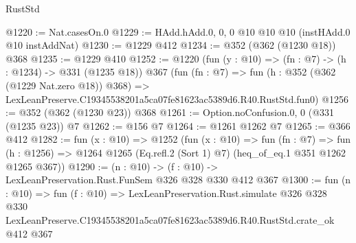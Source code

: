 \begin{lexlean}{RustStd}
\begin{coremodule}
@1220 := Nat.casesOn.{0}
@1229 := HAdd.hAdd.{0, 0, 0} @10 @10 @10 (instHAdd.{0} @10 instAddNat)
@1230 := @1229 @412
@1234 := @352 (@362 (@1230 @18)) @368
@1235 := @1229 @410
@1252 := @1220
    (fun (y : @10) => (fn : @7) -> (h : @1234) -> @331 (@1235 @18))
    @367
    (fun (fn : @7) =>
    fun (h : @352 (@362 (@1229 Nat.zero @18)) @368) =>
    LexLeanPreserve.C19345538201a5ca07fe81623ac5389d6.R40.RustStd.fun0)
@1256 := @352 (@362 (@1230 @23)) @368
@1261 := Option.noConfusion.{0, 0} (@331 (@1235 @23)) @7
@1262 := @156 @7
@1264 := @1261 @1262 @7
@1265 := @366 @412
@1282 := fun (x : @10) =>
  @1252
    (fun (x : @10) =>
    fun (fn : @7) =>
    fun (h : @1256) => @1264 @1265 (Eq.refl.{2} (Sort 1) @7) (heq_of_eq.{1} @351 @1262 @1265 @367))
@1290 := (n : @10) -> (f : @10) -> LexLeanPreservation.Rust.FunSem @326 @328 @330 @412 @367
@1300 := fun (n : @10) =>
  fun (f : @10) =>
  LexLeanPreservation.Rust.simulate
    @326
    @328
    @330
    LexLeanPreserve.C19345538201a5ca07fe81623ac5389d6.R40.RustStd.crate_ok
    @412
    @367
\end{coremodule}
\end{lexlean}
